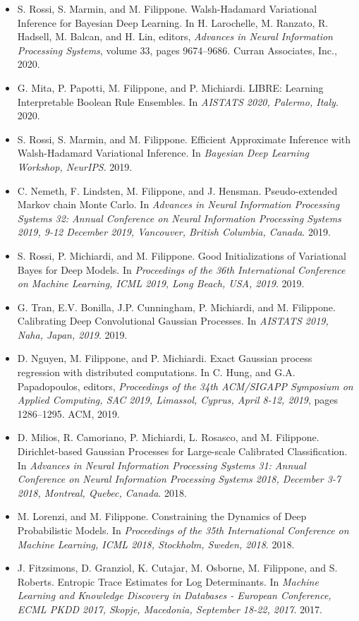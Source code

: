 \begin{itemize}
\item  S. Rossi, S. Marmin, and M. Filippone. {Walsh-Hadamard} Variational Inference for {B}ayesian Deep Learning. In H. Larochelle, M. Ranzato, R. Hadsell, M. Balcan, and H. Lin, editors, \emph{Advances in Neural Information Processing Systems}, volume 33, pages 9674--9686. Curran Associates, Inc., 2020.
\item  G. Mita, P. Papotti, M. Filippone, and P. Michiardi. {LIBRE: Learning Interpretable Boolean Rule Ensembles}. In \emph{AISTATS 2020, Palermo, Italy}. 2020.
\item  S. Rossi, S. Marmin, and M. Filippone. Efficient Approximate Inference with Walsh-Hadamard Variational Inference. In \emph{Bayesian Deep Learning Workshop, NeurIPS}. 2019.
\item  C. Nemeth, F. Lindsten, M. Filippone, and J. Hensman. {Pseudo-extended Markov chain Monte Carlo}. In \emph{Advances in Neural Information Processing Systems 32: Annual Conference on Neural Information Processing Systems 2019, 9-12 December 2019, Vancouver, British Columbia, Canada}. 2019.
\item  S. Rossi, P. Michiardi, and M. Filippone. {Good Initializations of Variational Bayes for Deep Models}. In \emph{Proceedings of the 36th International Conference on Machine Learning, ICML 2019, Long Beach, USA, 2019}. 2019.
\item  G. Tran, E.V. Bonilla, J.P. Cunningham, P. Michiardi, and M. Filippone. {Calibrating Deep Convolutional Gaussian Processes}. In \emph{AISTATS 2019, Naha, Japan, 2019}. 2019.
\item  D. Nguyen, M. Filippone, and P. Michiardi. Exact {G}aussian process regression with distributed computations. In C. Hung, and G.A. Papadopoulos, editors, \emph{Proceedings of the 34th {ACM/SIGAPP} Symposium on Applied Computing, {SAC} 2019, Limassol, Cyprus, April 8-12, 2019}, pages 1286--1295. {ACM}, 2019.
\item  D. Milios, R. Camoriano, P. Michiardi, L. Rosasco, and M. Filippone. {Dirichlet-based Gaussian Processes for Large-scale Calibrated Classification}. In \emph{Advances in Neural Information Processing Systems 31: Annual Conference on Neural Information Processing Systems 2018, December 3-7 2018, Montreal, Quebec, Canada}. 2018.
\item  M. Lorenzi, and M. Filippone. {Constraining the Dynamics of Deep Probabilistic Models}. In \emph{Proceedings of the 35th International Conference on Machine Learning, ICML 2018, Stockholm, Sweden, 2018}. 2018.
\item  J. Fitzsimons, D. Granziol, K. Cutajar, M. Osborne, M. Filippone, and S. Roberts. {Entropic Trace Estimates for Log Determinants}. In \emph{Machine Learning and Knowledge Discovery in Databases - European Conference, ECML PKDD 2017, Skopje, Macedonia, September 18-22, 2017}. 2017.

\end{itemize}

